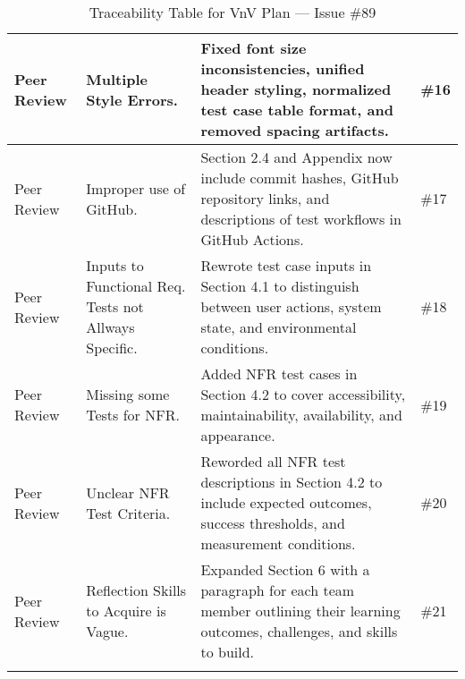 \documentclass{article}
\begin{document}
\begin{longtable}{|p{2cm}|p{5cm}|p{5cm}|p{2cm}|}
\hline
Peer Review & Multiple Style Errors. & Fixed font size inconsistencies, unified header styling, normalized test case table format, and removed spacing artifacts. & \#16 \\
\hline
Peer Review & Improper use of GitHub. & Section 2.4 and Appendix now include commit hashes, GitHub repository links, and descriptions of test workflows in GitHub Actions. & \#17 \\
\hline
Peer Review & Inputs to Functional Req. Tests not Allways Specific. & Rewrote test case inputs in Section 4.1 to distinguish between user actions, system state, and environmental conditions. & \#18 \\
\hline
Peer Review & Missing some Tests for NFR. & Added NFR test cases in Section 4.2 to cover accessibility, maintainability, availability, and appearance. & \#19 \\
\hline
Peer Review & Unclear NFR Test Criteria. & Reworded all NFR test descriptions in Section 4.2 to include expected outcomes, success thresholds, and measurement conditions. & \#20 \\
\hline
Peer Review & Reflection Skills to Acquire is Vague. & Expanded Section 6 with a paragraph for each team member outlining their learning outcomes, challenges, and skills to build. & \#21 \\
\hline
\caption{Traceability Table for VnV Plan — Issue \#89}
\end{longtable}

\vspace{1cm}
\end{document}
